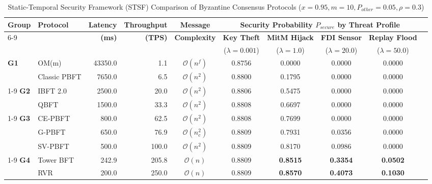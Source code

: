 \begin{table}[t]
\caption{Static-Temporal Security Framework (STSF) Comparison of Byzantine Consensus Protocols ($x=0.95, m=10, P_{other}=0.05, \rho=0.3$)}
\label{tab:stsf_comparison}
\centering
\scriptsize
\begin{tabular}{@{}llrrcccccc@{}}
\toprule
\multirow{2}{*}{\textbf{Group}} & \multirow{2}{*}{\textbf{Protocol}} & \multirow{2}{*}{\textbf{Latency}} & \multirow{2}{*}{\textbf{Throughput}} & \textbf{Message} & \multicolumn{4}{c}{\textbf{Security Probability $P_{secure}$ by Threat Profile}} \\
\cmidrule(lr){6-9}
 & & \textbf{(ms)} & \textbf{(TPS)} & \textbf{Complexity} & \textbf{Key Theft} & \textbf{MitM Hijack} & \textbf{FDI Sensor} & \textbf{Replay Flood} \\
 & & & & & ($\lambda=0.001$) & ($\lambda=1.0$) & ($\lambda=20.0$) & ($\lambda=50.0$) \\
\midrule
\textbf{G1} & OM(m) & 43350.0 & 1.1 & $\mathcal{O}(n^f)$ & 0.8756 & 0.0000 & 0.0000 & 0.0000 \\
 & Classic PBFT & 7650.0 & 6.5 & $\mathcal{O}(n^2)$ & 0.8800 & 0.1795 & 0.0000 & 0.0000 \\
\cmidrule(lr){1-9}
\textbf{G2} & IBFT 2.0 & 2500.0 & 20.0 & $\mathcal{O}(n^2)$ & 0.8806 & 0.5475 & 0.0000 & 0.0000 \\
 & QBFT & 1500.0 & 33.3 & $\mathcal{O}(n^2)$ & 0.8808 & 0.6697 & 0.0000 & 0.0000 \\
\cmidrule(lr){1-9}
\textbf{G3} & CE-PBFT & 800.0 & 62.5 & $\mathcal{O}(n^2)$ & 0.8808 & 0.7699 & 0.0000 & 0.0000 \\
 & G-PBFT & 650.0 & 76.9 & $\mathcal{O}(n_c^2)$ & 0.8809 & 0.7931 & 0.0356 & 0.0000 \\
 & SV-PBFT & 500.0 & 100.0 & $\mathcal{O}(n^2)$ & 0.8809 & 0.8170 & 0.0986 & 0.0000 \\
\cmidrule(lr){1-9}
\textbf{G4} & Tower BFT & 242.9 & 205.8 & $\mathcal{O}(n)$ & 0.8809 & \textbf{0.8515} & \textbf{0.3354} & \textbf{0.0502} \\
 & RVR & 200.0 & 250.0 & $\mathcal{O}(n)$ & 0.8809 & \textbf{0.8570} & \textbf{0.4073} & \textbf{0.1030} \\
\bottomrule
\end{tabular}
\end{table}
